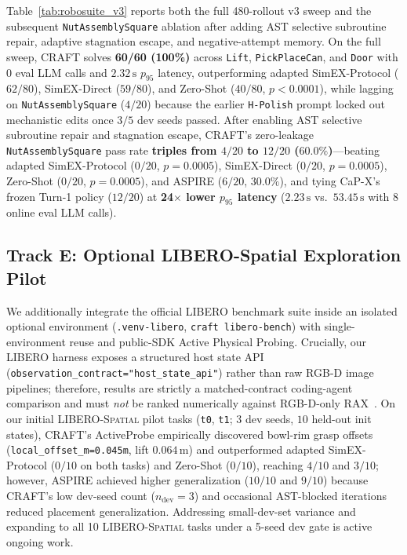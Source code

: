 \documentclass[10pt,journal]{IEEEtran}
\begin{document}
Table~\ref{tab:robosuite_v3} reports both the full 480-rollout v3 sweep and the subsequent \texttt{NutAssemblySquare} ablation after adding AST selective subroutine repair, adaptive stagnation escape, and negative-attempt memory. On the full sweep, CRAFT solves \textbf{60/60 (100\%)} across \texttt{Lift}, \texttt{PickPlaceCan}, and \texttt{Door} with $0$ eval LLM calls and $2.32\,\mathrm{s}$ $p_{95}$ latency, outperforming adapted SimEX-Protocol ($62/80$), SimEX-Direct ($59/80$), and Zero-Shot ($40/80$, $p{<}0.0001$), while lagging on \texttt{NutAssemblySquare} ($4/20$) because the earlier \texttt{H-Polish} prompt locked out mechanistic edits once $3/5$ dev seeds passed. After enabling AST selective subroutine repair and stagnation escape, CRAFT's zero-leakage \texttt{NutAssemblySquare} pass rate \textbf{triples from $4/20$ to $12/20$ ($60.0\%$)}---beating adapted SimEX-Protocol ($0/20$, $p{=}0.0005$), SimEX-Direct ($0/20$, $p{=}0.0005$), Zero-Shot ($0/20$, $p{=}0.0005$), and ASPIRE ($6/20$, $30.0\%$), and tying CaP-X's frozen Turn-1 policy ($12/20$) at \textbf{24$\times$ lower $p_{95}$ latency} ($2.23\,\mathrm{s}$ vs.\ $53.45\,\mathrm{s}$ with $8$ online eval LLM calls).

\begin{table}[t]
\centering
\caption{Zero-Leakage Robosuite Panda Benchmark (4 Tasks $\times$ 20 Held-Out Seeds = 480 Rollouts, \texttt{evidence\_source=simulator}) and Selective Subroutine Ablation on \texttt{NutAssemblySquare} ($n{=}20$). $\dagger$ denotes CaP-X Turn-1 frozen pass count before online regeneration.}
\label{tab:robosuite_v3}

\end{table}

\subsection{Track E: Optional LIBERO-Spatial Exploration Pilot}
We additionally integrate the official LIBERO benchmark suite inside an isolated optional environment (\texttt{.venv-libero}, \texttt{craft libero-bench}) with single-environment reuse and public-SDK Active Physical Probing. Crucially, our LIBERO harness exposes a structured host state API (\texttt{observation\_contract="host\_state\_api"}) rather than raw RGB-D image pipelines; therefore, results are strictly a matched-contract coding-agent comparison and must \emph{not} be ranked numerically against RGB-D-only RAX~\cite{huang2026rax}. On our initial \textsc{LIBERO-Spatial} pilot tasks (\texttt{t0}, \texttt{t1}; $3$ dev seeds, $10$ held-out init states), CRAFT's ActiveProbe empirically discovered bowl-rim grasp offsets (\texttt{local\_offset\_m=0.045m}, lift $0.064\,\mathrm{m}$) and outperformed adapted SimEX-Protocol ($0/10$ on both tasks) and Zero-Shot ($0/10$), reaching $4/10$ and $3/10$; however, ASPIRE achieved higher generalization ($10/10$ and $9/10$) because CRAFT's low dev-seed count ($n_{\mathrm{dev}}{=}3$) and occasional AST-blocked iterations reduced placement generalization. Addressing small-dev-set variance and expanding to all 10 \textsc{LIBERO-Spatial} tasks under a 5-seed dev gate is active ongoing work.
\end{document}
